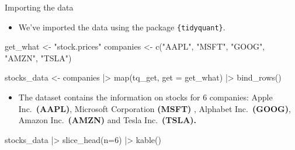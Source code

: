 \documentclass[
  12pt]{article}
\newenvironment{Shaded}{\begin{snugshade}}{\end{snugshade}}
\newcommand{\AttributeTok}[1]{\textcolor[rgb]{0.40,0.45,0.13}{#1}}
\newcommand{\DecValTok}[1]{\textcolor[rgb]{0.68,0.00,0.00}{#1}}
\newcommand{\FunctionTok}[1]{\textcolor[rgb]{0.28,0.35,0.67}{#1}}
\newcommand{\NormalTok}[1]{\textcolor[rgb]{0.00,0.23,0.31}{#1}}
\newcommand{\OtherTok}[1]{\textcolor[rgb]{0.00,0.23,0.31}{#1}}
\newcommand{\SpecialCharTok}[1]{\textcolor[rgb]{0.37,0.37,0.37}{#1}}
\newcommand{\StringTok}[1]{\textcolor[rgb]{0.13,0.47,0.30}{#1}}
\providecommand{\tightlist}{%
  \setlength{\itemsep}{0pt}\setlength{\parskip}{0pt}}\usepackage{longtable,booktabs,array}
\theoremstyle{definition}
\theoremstyle{remark}
\begin{document}
Importing the data

\begin{itemize}
\tightlist
\item
  We've imported the data using the package \texttt{\{tidyquant\}}.
\end{itemize}

\begin{Shaded}
\begin{Highlighting}[]
\NormalTok{get\_what }\OtherTok{\textless{}{-}} \StringTok{"stock.prices"}
\NormalTok{companies }\OtherTok{\textless{}{-}} \FunctionTok{c}\NormalTok{(}\StringTok{"AAPL"}\NormalTok{,}
             \StringTok{"MSFT"}\NormalTok{,}
             \StringTok{"GOOG"}\NormalTok{,}
             \StringTok{"AMZN"}\NormalTok{,}
             \StringTok{"TSLA"}\NormalTok{)}

\NormalTok{stocks\_data }\OtherTok{\textless{}{-}} 
\NormalTok{  companies }\SpecialCharTok{|\textgreater{}} 
  \FunctionTok{map}\NormalTok{(tq\_get, }\AttributeTok{get =}\NormalTok{ get\_what) }\SpecialCharTok{|\textgreater{}} 
  \FunctionTok{bind\_rows}\NormalTok{()}
\end{Highlighting}
\end{Shaded}

\begin{itemize}
\tightlist
\item
  The dataset contains the information on stocks for 6 companies: Apple
  Inc.~\textbf{(AAPL)}, Microsoft Corporation \textbf{(MSFT)} , Alphabet
  Inc.~\textbf{(GOOG)}, Amazon Inc.~\textbf{(AMZN)} and Tesla
  Inc.~\textbf{(TSLA).}
\end{itemize}

\begin{Shaded}
\begin{Highlighting}[]
\NormalTok{stocks\_data }\SpecialCharTok{|\textgreater{}} 
  \FunctionTok{slice\_head}\NormalTok{(}\AttributeTok{n=}\DecValTok{6}\NormalTok{) }\SpecialCharTok{|\textgreater{}} 
  \FunctionTok{kable}\NormalTok{()}
\end{Highlighting}
\end{Shaded}
\end{document}
